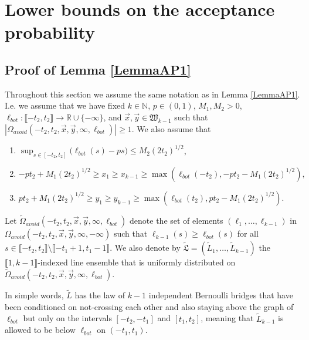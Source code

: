 %
\section{Lower bounds on the acceptance probability}\label{Section6}

\subsection{Proof of Lemma \ref{LemmaAP1}} Throughout this section we assume the same notation as in Lemma \ref{LemmaAP1}. I.e. we assume that we have fixed $k \in \mathbb{N}$, $p \in (0,1)$, $M_1, M_2 > 0$, $\ell_{bot}: \llbracket -t_2, t_2 \rrbracket \rightarrow \mathbb{R} \cup \{ - \infty \}$, and $\vec{x}, \vec{y} \in \mathfrak{W}_{k-1}$ such that $|\Omega_{avoid}(-t_2, t_2, \vec{x}, \vec{y}, \infty, \ell_{bot})| \geq 1$. We also assume that
\begin{enumerate}
	\item $\sup_{s \in [- t_2,t_2]}\big(\ell_{bot}(s)  - ps \big)  \leq M_2 (2t_2)^{1/2}$,
	\item  $-pt_2 + M_1 (2t_2)^{1/2} \geq  x_1 \geq  x_{k-1} \geq \max\left(\ell_{bot}(-t_2), -pt_2- M_1 (2t_2)^{1/2}\right),$
	\item $pt_2 + M_1 (2t_2)^{1/2} \geq y_1 \geq y_{k-1} \geq  \max \left( \ell_{bot}(t_2),  p t_2- M_1(2t_2)^{1/2} \right).$
\end{enumerate}

\begin{definition}
	Let $\tilde{\Omega}_{avoid}(-t_2, t_2, \vec{x}, \vec{y}, \infty, \ell_{bot})$ denote the set of elements $(\ell_1, \dots, \ell_{k-1})$ in \\${\Omega}_{avoid}(-t_2, t_2, \vec{x}, \vec{y}, \infty, -\infty)$ such that $\ell_{k-1}(s) \geq \ell_{bot}(s)$ for all $s \in \llbracket -t_2, t_2 \rrbracket \setminus \llbracket -t_1 + 1, t_1 - 1 \rrbracket$. We also denote by $\tilde{\mathfrak{L}} = (\tilde{L}_1, \dots, \tilde{L}_{k-1})$ the $\llbracket 1, k-1 \rrbracket$-indexed line ensemble that is uniformly distributed on $\tilde{\Omega}_{avoid}(-t_2, t_2, \vec{x}, \vec{y}, \infty, \ell_{bot})$.
\end{definition}
In simple words, $\tilde{L}$ has the law of $k-1$ independent Bernoulli bridges that have been conditioned on not-crossing each other and also staying above the graph of $\ell_{bot}$ but only on the intervals $[-t_2, -t_1]$ and $[t_1, t_2]$, meaning that $\tilde{L}_{k-1}$ is allowed to be below $\ell_{bot}$ on $(-t_1, t_1).$ 

